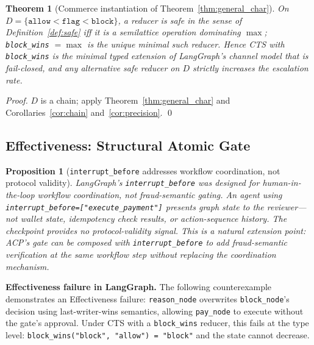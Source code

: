 \documentclass{article}
\newtheorem{proposition}{Proposition}
\newtheorem{theorem}{Theorem}
\begin{document}
\begin{theorem}[Commerce instantiation of Theorem~\ref{thm:general_char}]
\label{thm:char}
On $D=\{\texttt{allow}<\texttt{flag}<\texttt{block}\}$, a reducer is safe in the sense of
Definition~\ref{def:safe} iff it is a semilattice operation dominating $\max$; \texttt{block\_wins}
$=\max$ is the unique minimal such reducer. Hence CTS with \texttt{block\_wins} is the
\emph{minimal} typed extension of LangGraph's channel model that is fail-closed, and any
alternative safe reducer on $D$ strictly increases the escalation rate.
\end{theorem}

\begin{proof}
$D$ is a chain; apply Theorem~\ref{thm:general_char} and Corollaries~\ref{cor:chain}
and~\ref{cor:precision}. \qed
\end{proof}

\subsection{Effectiveness: Structural Atomic Gate}
\label{sec:gate}

\begin{proposition}[\texttt{interrupt\_before} addresses workflow coordination, not protocol validity]
\label{prop:interrupt}
LangGraph's \texttt{interrupt\_before} was designed for human-in-the-loop workflow coordination, not fraud-semantic gating. An agent using \texttt{interrupt\_before=["execute\_payment"]} presents graph state to the reviewer---not wallet state, idempotency check results, or action-sequence history. The checkpoint provides no protocol-validity signal. This is a natural extension point: ACP's gate can be composed with \texttt{interrupt\_before} to add fraud-semantic verification at the same workflow step without replacing the coordination mechanism.
\end{proposition}

\textbf{Effectiveness failure in LangGraph.} The following counterexample demonstrates an Effectiveness failure: \texttt{reason\_node} overwrites \texttt{block\_node}'s decision using last-writer-wins semantics, allowing \texttt{pay\_node} to execute without the gate's approval. Under CTS with a \texttt{block\_wins} reducer, this fails at the type level: \texttt{block\_wins("block", "allow") = "block"} and the state cannot decrease.
\end{document}
